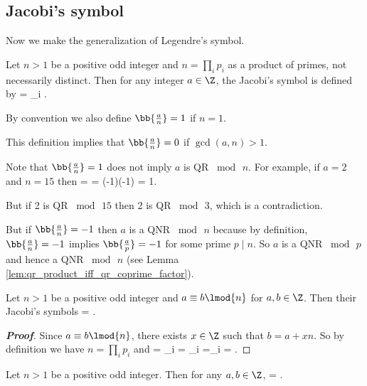 \subsection{Jacobi's symbol}

Now we make the generalization of Legendre's symbol.

\begin{definition}
Let $n>1$ be a positive odd integer and $n = \prod_i p_i$ as a product of primes, not necessarily distinct. Then for any integer $a\in \Z$, the Jacobi's symbol is defined by
\be
{} = \prod_i .
\ee

By convention we also define $\bb{\frac an} =1$ if $n=1$.
\end{definition}

\begin{remark}
This definition implies that $\bb{\frac an} = 0$ if $\gcd(a,n) >1$. 

Note that $\bb{\frac an} = 1$ does not imply $a$ is QR $\bmod\, n$. For example, if $a=2$ and $n=15$ then
\be
{} =  = (-1)(-1) = 1.
\ee

But if 2 is QR $\bmod\, 15$ then 2 is QR $\bmod\,3$, which is a contradiction. 

But if $\bb{\frac an} = -1$ then $a$ is a QNR $\bmod\, n$ because by definition, $\bb{\frac an} =-1$ implies $\bb{\frac ap} = -1$ for some prime $p\mid n$. So $a$ is a QNR $\bmod\, p$ and hence a QNR $\bmod \, n$ (see Lemma \ref{lem:qr_product_iff_qr_coprime_factor}).
\end{remark}

\begin{proposition}
Let $n>1$ be a positive odd integer and $a\equiv b\lmod{n}$ for $a,b\in \Z$. Then their Jacobi's symbols 
\be
{} = .
\ee
\end{proposition}

\begin{proof}[\bf Proof]
Since $a\equiv b\lmod{n}$, there exists $x\in \Z$ such that $b = a+ xn$. So by definition we have $n = \prod_i p_i$ and
\be
{} = \prod_i = \prod_i =\prod_i = .
\ee
\end{proof}

\begin{proposition}\label{pro:jacobi_symbol_product}
Let $n>1$ be a positive odd integer. Then for any $a,b\in \Z$,
\be
{} = .
\ee
\end{proposition}

